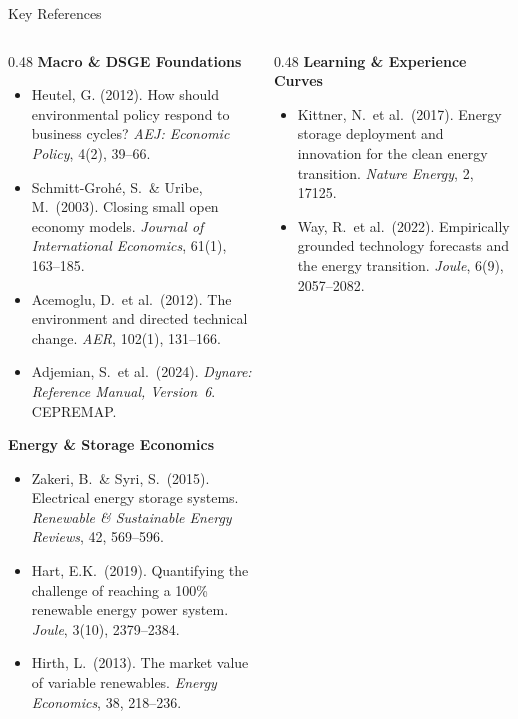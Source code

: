 \documentclass[aspectratio=169,10pt]{beamer}
\begin{document}
\begin{frame}{Key References}
  \begin{columns}[T]
    \begin{column}{0.48\textwidth}
      \textbf{\textcolor{fuvblue}{Macro \& DSGE Foundations}}
      \begin{itemize}\scriptsize
        \item Heutel, G. (2012). How should environmental policy respond to business cycles? \textit{AEJ: Economic Policy}, 4(2), 39--66.
        \item Schmitt-Grohé, S.\ \& Uribe, M.\ (2003). Closing small open economy models. \textit{Journal of International Economics}, 61(1), 163--185.
        \item Acemoglu, D.\ et al.\ (2012). The environment and directed technical change. \textit{AER}, 102(1), 131--166.
        \item Adjemian, S.\ et al.\ (2024). \textit{Dynare: Reference Manual, Version~6}. CEPREMAP.
      \end{itemize}
      \vspace{0.4em}
      \textbf{\textcolor{fuvblue}{Energy \& Storage Economics}}
      \begin{itemize}\scriptsize
        \item Zakeri, B.\ \& Syri, S.\ (2015). Electrical energy storage systems. \textit{Renewable \& Sustainable Energy Reviews}, 42, 569--596.
        \item Hart, E.K.\ (2019). Quantifying the challenge of reaching a 100\% renewable energy power system. \textit{Joule}, 3(10), 2379--2384.
        \item Hirth, L.\ (2013). The market value of variable renewables. \textit{Energy Economics}, 38, 218--236.
      \end{itemize}
    \end{column}
    \begin{column}{0.48\textwidth}
      \textbf{\textcolor{fuvblue}{Learning \& Experience Curves}}
      \begin{itemize}\scriptsize
        \item Kittner, N.\ et al.\ (2017). Energy storage deployment and innovation for the clean energy transition. \textit{Nature Energy}, 2, 17125.
        \item Way, R.\ et al.\ (2022). Empirically grounded technology forecasts and the energy transition. \textit{Joule}, 6(9), 2057--2082.
      \end{itemize}

\end{column}
\end{columns}
\end{frame}
\end{document}
